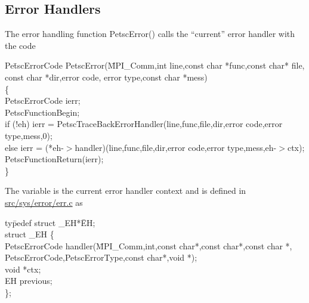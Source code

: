 \documentclass[twoside,12pt]{../sty/report_petsc}
\begin{document}
\subsection{Error Handlers}
The error handling function PetscError() calls the ``current'' error handler
with the code
\begin{tabbing}
Pe\=tscErrorCode PetscError(\=MPI\_Comm,int line,const char *func,const char* file,\\
 \> \> const char *dir,error code, error type,const char *mess)\\
\{ \\
  \> PetscErrorCode ierr;\\
  \>PetscFunctionBegin;\\
  \>if (!eh)     ierr = PetscTraceBackErrorHandler(line,func,file,dir,error code,error type,mess,0);\\
  \>else         ierr = (*eh-$>$handler)(line,func,file,dir,error code,error type,mess,eh-$>$ctx);\\
  \>PetscFunctionReturn(ierr);\\
\}
\end{tabbing}
The variable  is the current error handler context and is defined in
 \href{http://www.mcs.anl.gov/petsc/petsc-dev/src/sys/error/err.c.html}{src/sys/error/err.c} as
\begin{tabbing}
ty\=pedef struct \_EH*\= EH;\\
struct \_EH \{\\
  \>PetscErrorCode \> handler(\=MPI_Comm,int,const char*,const char*,const char *,\\
\> \> \> PetscErrorCode,PetscErrorType,const char*,void *);\\
  \>void \>  *ctx;\\
  \>EH   \>  previous;\\
\};
\end{tabbing}
\end{document}
